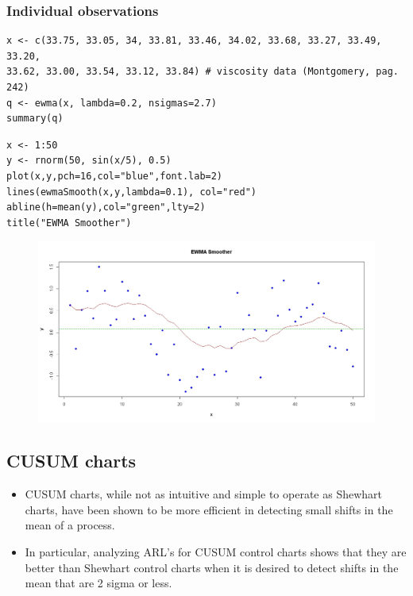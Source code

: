 \documentclass[]{article}
\begin{document}
\subsubsection{Individual observations}
\begin{framed}
\begin{verbatim}
x <- c(33.75, 33.05, 34, 33.81, 33.46, 34.02, 33.68, 33.27, 33.49, 33.20,
33.62, 33.00, 33.54, 33.12, 33.84) # viscosity data (Montgomery, pag. 242)
q <- ewma(x, lambda=0.2, nsigmas=2.7)
summary(q)
\end{verbatim}
\end{framed}

\begin{framed}
\begin{verbatim}
x <- 1:50
y <- rnorm(50, sin(x/5), 0.5)
plot(x,y,pch=16,col="blue",font.lab=2)
lines(ewmaSmooth(x,y,lambda=0.1), col="red")
abline(h=mean(y),col="green",lty=2)
title("EWMA Smoother")
\end{verbatim}
\end{framed}
\begin{figure}
\centering
\includegraphics[width=0.7\linewidth]{./qccEWMAsmoother}
\caption{}
\label{fig:qccEWMAsmoother}
\end{figure}
\newpage
\subsection{CUSUM charts}
\begin{itemize}
\item CUSUM charts, while not as intuitive and simple to operate as Shewhart charts, have been shown to be more efficient in detecting small shifts in the mean of a process. \item In particular, analyzing ARL's for CUSUM control charts shows that they are better than Shewhart control charts when it is desired to detect shifts in the mean that are 2 sigma or less.
\end{itemize}
\end{document}
